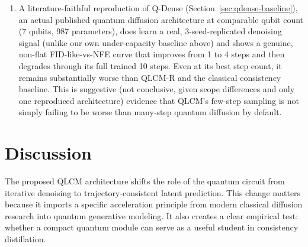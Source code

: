 \documentclass[11pt]{article}
\begin{document}
\begin{enumerate}
    baseline is too capacity-limited to make the intended ``QLCM needs fewer
    steps than quantum diffusion'' comparison meaningful, and mechanistically
    corroborates the QLCM-H failure mode: at 4 qubits and depth 2, the
    circuit itself, not the sampling trajectory, is the bottleneck.
    \item A literature-faithful reproduction of Q-Dense
    \citep{kolle2024qddm} (Section~\ref{sec:qdense-baseline}), an actual
    published quantum diffusion architecture at comparable qubit count (7
    qubits, 987 parameters), does learn a real, 3-seed-replicated denoising
    signal (unlike our own under-capacity baseline above) and shows a
    genuine, non-flat FID-like-vs-NFE curve that improves from 1 to 4 steps
    and then degrades through its full trained 10 steps. Even at its best
    step count, it remains substantially worse than QLCM-R and the classical
    consistency baseline. This is suggestive (not conclusive, given scope
    differences and only one reproduced architecture) evidence that QLCM's
    few-step sampling is not simply failing to be worse than many-step
    quantum diffusion by default.
\end{enumerate}

\section{Discussion}

The proposed QLCM architecture shifts the role of the quantum circuit from
iterative denoising to trajectory-consistent latent prediction. This change
matters because it imports a specific acceleration principle from modern
classical diffusion research into quantum generative modeling. It also creates a
clear empirical test: whether a compact quantum module can serve as a useful
student in consistency distillation.
\end{document}
